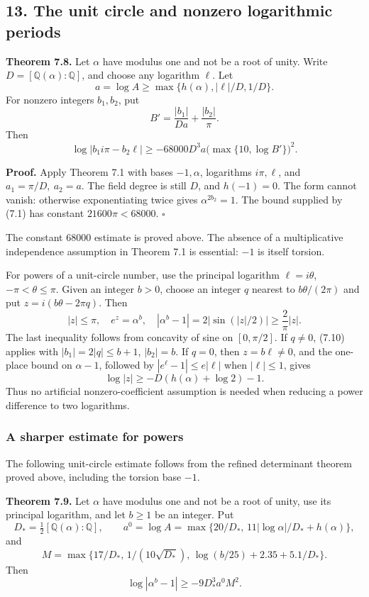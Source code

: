 \documentclass[
  11pt,
  a4paper,
]{article}
\begin{document}
\subsection{13. The unit circle and nonzero logarithmic
periods}\label{the-unit-circle-and-nonzero-logarithmic-periods}

\textbf{Theorem 7.8.} Let \(\alpha\) have modulus one and not be a root
of unity. Write \(D=[\mathbb Q(\alpha):\mathbb Q]\), and choose any
logarithm \(\ell\). Let \[
a=\log A\ge\max\{h(\alpha),|\ell|/D,1/D\}.
\] For nonzero integers \(b_1,b_2\), put \[
B'=\frac{|b_1|}{Da}+\frac{|b_2|}{\pi}.
\] Then \[
\log|b_1i\pi-b_2\ell|
\ge-68000D^3a\bigl(\max\{10,\log B'\}\bigr)^2. \tag{7.10}
\]

\textbf{Proof.} Apply Theorem 7.1 with bases \(-1,\alpha\), logarithms
\(i\pi,\ell\), and \(a_1=\pi/D,\ a_2=a\). The field degree is still
\(D\), and \(h(-1)=0\). The form cannot vanish: otherwise exponentiating
twice gives \(\alpha^{2b_2}=1\). The bound supplied by (7.1) has
constant \(21600\pi<68000\). \(\square\)

The constant \(68000\) estimate is proved above. The absence of a
multiplicative independence assumption in Theorem 7.1 is essential:
\(-1\) is itself torsion.

For powers of a unit-circle number, use the principal logarithm
\(\ell=i\theta\), \(-\pi<\theta\le\pi\). Given an integer \(b>0\),
choose an integer \(q\) nearest to \(b\theta/(2\pi)\) and put
\(z=i(b\theta-2\pi q)\). Then \[
|z|\le\pi,\quad e^z=\alpha^b,\quad
|\alpha^b-1|=2|\sin(|z|/2)|\ge\frac{2}{\pi}|z|.
\] The last inequality follows from concavity of sine on \([0,\pi/2]\).
If \(q\ne0\), (7.10) applies with \(|b_1|=2|q|\le b+1\), \(|b_2|=b\). If
\(q=0\), then \(z=b\ell\ne0\), and the one-place bound on \(\alpha-1\),
followed by \(|e^\ell-1|\le e|\ell|\) when \(|\ell|\le1\), gives \[
\log|z|\ge-D(h(\alpha)+\log2)-1.
\] Thus no artificial nonzero-coefficient assumption is needed when
reducing a power difference to two logarithms.

\subsubsection{A sharper estimate for
powers}\label{a-sharper-estimate-for-powers}

The following unit-circle estimate follows from the refined determinant
theorem proved above, including the torsion base \(-1\).

\textbf{Theorem 7.9.} Let \(\alpha\) have modulus one and not be a root
of unity, use its principal logarithm, and let \(b\ge1\) be an integer.
Put \[
D_*=\tfrac12[\mathbb Q(\alpha):\mathbb Q],\qquad
a^0=\log A=\max\{20/D_*,\,11|\log\alpha|/D_*+h(\alpha)\},
\] and \[
M=\max\{17/D_*,\,1/(10\sqrt{D_*}),\,
\log(b/25)+2.35+5.1/D_*\}.
\] Then \[
\log|\alpha^b-1|\ge-9D_*^3a^0M^2. \tag{7.34}
\]
\end{document}
